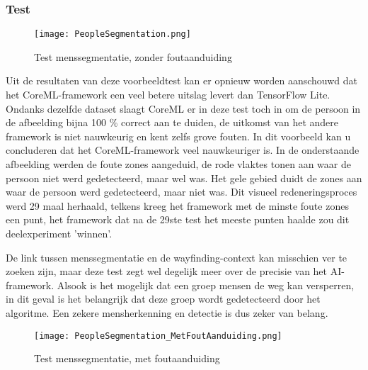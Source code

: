 \subsubsection{Test}

\begin{figure}[H]
	\centering
	\texttt{[image: PeopleSegmentation.png]}
	\caption{Test menssegmentatie, zonder foutaanduiding}
\end{figure}
\pagebreak

Uit de resultaten van deze voorbeeldtest kan er opnieuw worden aanschouwd dat het CoreML-framework een veel betere uitslag levert dan TensorFlow Lite. Ondanks dezelfde dataset slaagt CoreML er in deze test toch in om de persoon in de afbeelding bijna 100 \% correct aan te duiden, de uitkomst van het andere framework is niet nauwkeurig en kent zelfs grove fouten. In dit voorbeeld kan u concluderen dat het CoreML-framework veel nauwkeuriger is. In de onderstaande afbeelding werden de foute zones aangeduid, de rode vlaktes tonen aan waar de persoon niet werd gedetecteerd, maar wel was. Het gele gebied duidt de zones aan waar de persoon werd gedetecteerd, maar niet was. Dit visueel redeneringsproces werd 29 maal herhaald, telkens kreeg het framework met de minste foute zones een punt, het framework dat na de 29ste test het meeste punten haalde zou dit deelexperiment 'winnen'.

 De link tussen menssegmentatie en de wayfinding-context kan misschien ver te zoeken zijn, maar deze test zegt wel degelijk meer over de precisie van het AI-framework. Alsook is het mogelijk dat een groep mensen de weg kan versperren, in dit geval is het belangrijk dat deze groep wordt gedetecteerd door het algoritme. Een zekere mensherkenning en detectie is dus zeker van belang.

\begin{figure}[H]
	\centering
	\texttt{[image: PeopleSegmentation\_MetFoutAanduiding.png]}
	\caption{Test menssegmentatie, met foutaanduiding}
\end{figure}
\pagebreak

